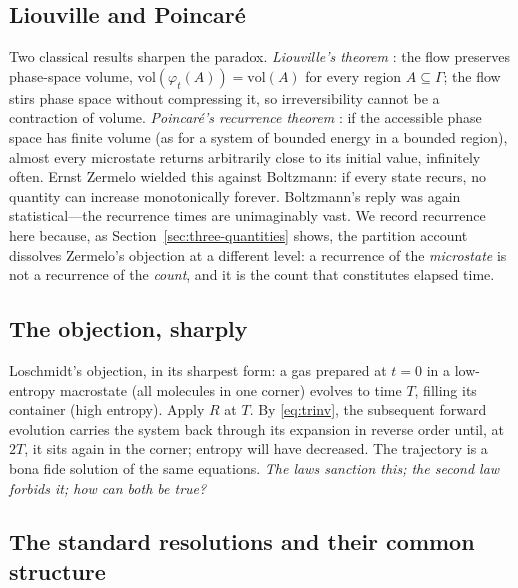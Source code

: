 \documentclass[11pt,a4paper]{article}
\theoremstyle{thmstyle}
\theoremstyle{definition}
\theoremstyle{remark}
\begin{document}
\subsection{Liouville and Poincar\'e}
\label{sec:liouville}

Two classical results sharpen the paradox. \emph{Liouville's theorem}
\citep{liouville1838}: the flow preserves phase-space volume,
$\mathrm{vol}(\varphi_{t}(A))=\mathrm{vol}(A)$ for every region
$A\subseteq\Gamma$; the flow stirs phase space without compressing it,
so irreversibility cannot be a contraction of volume.
\emph{Poincar\'e's recurrence theorem} \citep{poincare1890}: if the
accessible phase space has finite volume (as for a system of bounded
energy in a bounded region), almost every microstate returns
arbitrarily close to its initial value, infinitely often. Ernst Zermelo
\citep{zermelo1896} wielded this against Boltzmann: if every state
recurs, no quantity can increase monotonically forever. Boltzmann's
reply \citep{boltzmann1896} was again statistical---the recurrence times
are unimaginably vast. We record recurrence here because, as
Section~\ref{sec:three-quantities} shows, the partition account
dissolves Zermelo's objection at a different level: a recurrence of the
\emph{microstate} is not a recurrence of the \emph{count}, and it is the
count that constitutes elapsed time.

\subsection{The objection, sharply}
\label{sec:objection-sharp}

Loschmidt's objection, in its sharpest form: a gas prepared at $t=0$ in a
low-entropy macrostate (all molecules in one corner) evolves to time $T$,
filling its container (high entropy). Apply $R$ at $T$. By
\eqref{eq:trinv}, the subsequent forward evolution carries the system
back through its expansion in reverse order until, at $2T$, it sits again
in the corner; entropy will have decreased. The trajectory is a bona
fide solution of the same equations. \emph{The laws sanction this; the
second law forbids it; how can both be true?}

\subsection{The standard resolutions and their common structure}
\label{sec:standard}
\end{document}

